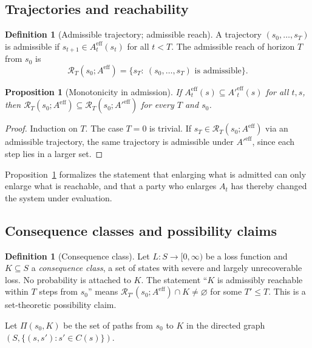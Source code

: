 \documentclass[11pt]{article}
\newtheorem{proposition}[theorem]{Proposition}
\theoremstyle{definition}
\newtheorem{definition}[theorem]{Definition}
\begin{document}
\subsection{Trajectories and reachability}

\begin{definition}[Admissible trajectory; admissible reach]
A trajectory $(s_0,\dots,s_T)$ is admissible if $s_{t+1}\in A_t^{\mathrm{eff}}(s_t)$ for all $t<T$. The admissible reach of horizon $T$ from $s_0$ is
\[
\mathcal{R}_T(s_0;A^{\mathrm{eff}})=\{s_T:\ (s_0,\dots,s_T)\text{ is admissible}\}.
\]
\end{definition}

\begin{proposition}[Monotonicity in admission]\label{prop:A1}
If $A^{\mathrm{eff}}_t(s)\subseteq A'^{\mathrm{eff}}_t(s)$ for all $t,s$, then $\mathcal{R}_T(s_0;A^{\mathrm{eff}})\subseteq\mathcal{R}_T(s_0;A'^{\mathrm{eff}})$ for every $T$ and $s_0$.
\end{proposition}
\begin{proof}
Induction on $T$. The case $T=0$ is trivial. If $s_T\in\mathcal{R}_T(s_0;A^{\mathrm{eff}})$ via an admissible trajectory, the same trajectory is admissible under $A'^{\mathrm{eff}}$, since each step lies in a larger set.
\end{proof}

Proposition~\ref{prop:A1} formalizes the statement that enlarging what is admitted can only enlarge what is reachable, and that a party who enlarges $A_t$ has thereby changed the system under evaluation.

\subsection{Consequence classes and possibility claims}

\begin{definition}[Consequence class]
Let $L:S\to[0,\infty)$ be a loss function and $K\subseteq S$ a \emph{consequence class}, a set of states with severe and largely unrecoverable loss. No probability is attached to $K$. The statement ``$K$ is admissibly reachable within $T$ steps from $s_0$'' means $\mathcal{R}_{T'}(s_0;A^{\mathrm{eff}})\cap K\neq\varnothing$ for some $T'\le T$. This is a set-theoretic possibility claim.
\end{definition}

Let $\Pi(s_0,K)$ be the set of paths from $s_0$ to $K$ in the directed graph $(S,\{(s,s'):s'\in C(s)\})$.
\end{document}
